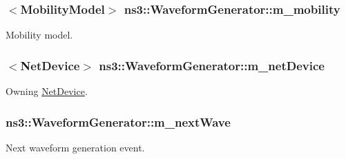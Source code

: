 \subsubsection[{\texorpdfstring{m\+\_\+mobility}{m_mobility}}]{$<${\bf Mobility\+Model}$>$ ns3\+::\+Waveform\+Generator\+::m\+\_\+mobility\hspace{0.3cm}{\ttfamily [private]}}\hypertarget{classns3_1_1WaveformGenerator_a2efb4c038ffdd5ce09363102c70ecc6f}{}\label{classns3_1_1WaveformGenerator_a2efb4c038ffdd5ce09363102c70ecc6f}


Mobility model. 

\subsubsection[{\texorpdfstring{m\+\_\+net\+Device}{m_netDevice}}]{$<${\bf Net\+Device}$>$ ns3\+::\+Waveform\+Generator\+::m\+\_\+net\+Device\hspace{0.3cm}{\ttfamily [private]}}\hypertarget{classns3_1_1WaveformGenerator_a7aa25d0649c5fae259f724a5fa48cdb9}{}\label{classns3_1_1WaveformGenerator_a7aa25d0649c5fae259f724a5fa48cdb9}


Owning \hyperlink{classns3_1_1NetDevice}{Net\+Device}. 

\subsubsection[{\texorpdfstring{m\+\_\+next\+Wave}{m_nextWave}}]{ ns3\+::\+Waveform\+Generator\+::m\+\_\+next\+Wave\hspace{0.3cm}{\ttfamily [private]}}\hypertarget{classns3_1_1WaveformGenerator_a19a2480971ecc44ffc0dec3034bcfc29}{}\label{classns3_1_1WaveformGenerator_a19a2480971ecc44ffc0dec3034bcfc29}


Next waveform generation event. 

